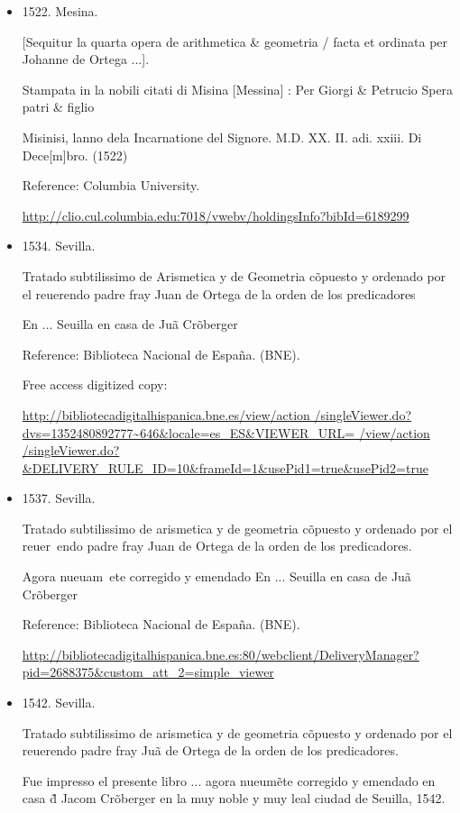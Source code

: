 \documentclass{amsart}
\begin{document}
\begin{itemize}
\item 1522. Mesina.

[Sequitur la quarta opera de arithmetica \& geometria / facta et ordinata per Johanne de
Ortega ...].

Stampata in la nobili citati di Misina [Messina] : Per Giorgi \& Petrucio Spera patri \& figlio

Misinisi, lanno dela Incarnatione del Signore. M.D. XX. II. adi. xxiii. Di Dece[m]bro. (1522)

Reference: 
Columbia University.

 \url{http://clio.cul.columbia.edu:7018/vwebv/holdingsInfo?bibId=6189299}

\item 1534. Sevilla.

Tratado subtilissimo de Arismetica y de Geometria
c\~opuesto y ordenado por el reuerendo padre fray Juan de Ortega de la orden de los predicadores

En ... Seuilla en casa de Ju\~a Cr\~oberger

Reference: Biblioteca Nacional de Espa\~na. (BNE).

Free access digitized copy:

\url{http://bibliotecadigitalhispanica.bne.es/view/action
/singleViewer.do?dvs=1352480892777~646&locale=es_ES&VIEWER_URL=
/view/action
/singleViewer.do?&DELIVERY_RULE_ID=10&frameId=1&usePid1=true&usePid2=true}

\item 1537. Sevilla.

Tratado subtilissimo de arismetica y de geometria c\~opuesto y ordenado por el reuer~endo padre fray Juan de Ortega de la orden de los predicadores.

Agora nueuam~ete corregido y emendado En ... Seuilla en casa de Ju\~a Cr\~oberger

Reference: Biblioteca Nacional de Espa\~na. (BNE).

\url{http://bibliotecadigitalhispanica.bne.es:80/webclient/DeliveryManager?pid=2688375&custom_att_2=simple_viewer }

\item 1542. Sevilla.

Tratado subtilissimo de arismetica y de geometria c\~opuesto y ordenado por el reuerendo padre fray Ju\~a de Ortega de la orden de los predicadores.

   Fue impresso el presente libro ... agora nueum\~ete corregido y emendado en casa \~d Jacom Cr\~oberger en la muy noble y muy leal ciudad de Seuilla, 1542.


\end{itemize}
\end{document}
